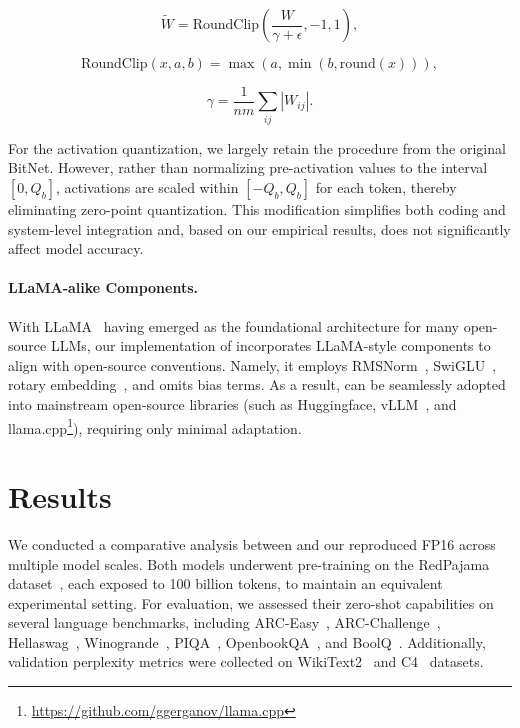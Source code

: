 \begin{equation}
    \widetilde{W} = \mathrm{RoundClip}(\frac{W}{\gamma + \epsilon}, -1, 1),
\end{equation}

\begin{equation}
    \mathrm{RoundClip}(x, a, b) = \max(a, \min(b, \mathrm{round}(x))),
\end{equation}

\begin{equation}
    \gamma = \frac{1}{nm}\sum_{ij} |W_{ij}|.
\end{equation}

For the activation quantization, we largely retain the procedure from the original BitNet. However, rather than normalizing pre-activation values to the interval $[0, Q_b]$, activations are scaled within $[-Q_b, Q_b]$ for each token, thereby eliminating zero-point quantization. This modification simplifies both coding and system-level integration and, based on our empirical results, does not significantly affect model accuracy.

\paragraph{LLaMA-alike Components.}

With LLaMA~\cite{llama, llama2} having emerged as the foundational architecture for many open-source LLMs, our implementation of  incorporates LLaMA-style components to align with open-source conventions. Namely, it employs RMSNorm~\cite{rmsnorm}, SwiGLU~\cite{swiglu}, rotary embedding~\cite{rope}, and omits bias terms. As a result,  can be seamlessly adopted into mainstream open-source libraries (such as Huggingface, vLLM~\cite{vllm}, and llama.cpp\footnote{\url{https://github.com/ggerganov/llama.cpp}}), requiring only minimal adaptation.

\section{Results}

We conducted a comparative analysis between  and our reproduced FP16  across multiple model scales. Both models underwent pre-training on the RedPajama dataset~\cite{redpajama}, each exposed to 100 billion tokens, to maintain an equivalent experimental setting. For evaluation, we assessed their zero-shot capabilities on several language benchmarks, including ARC-Easy~\cite{arc}, ARC-Challenge~\cite{arc}, Hellaswag~\cite{hellaswag}, Winogrande~\cite{winoGrande}, PIQA~\cite{piqa}, OpenbookQA~\cite{openbookqa}, and BoolQ~\cite{boolq}. Additionally, validation perplexity metrics were collected on WikiText2~\cite{wikitext2} and C4~\cite{c4} datasets.

